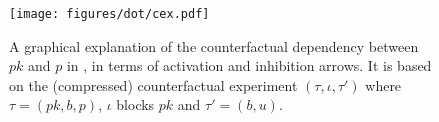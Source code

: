 \begin{figure}
  \vspace*{-0.5cm}
  \begin{center}
    \texttt{[image: figures/dot/cex.pdf]}
  \end{center}
  \vspace{-0.8cm}
  \caption{A graphical explanation of the counterfactual dependency
    between $pk$ and $p$ in \protect\RefTrace{}, in
    terms of activation and inhibition arrows. It is based on the
    (compressed) counterfactual experiment $(\tau, \iota, \tau')$ where
    $\tau = (pk, b, p)$, $\iota$ blocks $pk$ and $\tau' = (b, u)$.}
  \label{fig:cex}
\end{figure}
